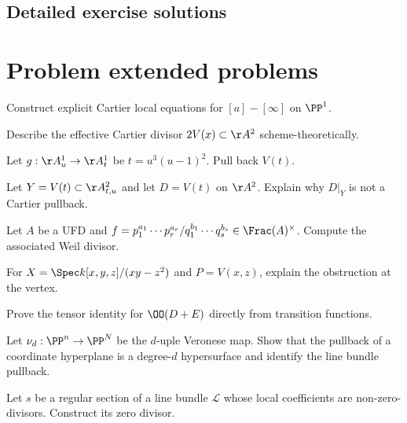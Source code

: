 \subsection*{Detailed exercise solutions}

\fi
\section{Problem extended problems}
\begin{problem}\label{prob:vi40-01}
Construct explicit Cartier local equations for \([a]-[\infty]\) on \(\PP^1\).
\end{problem}
\begin{problem}\label{prob:vi40-02}
Describe the effective Cartier divisor \(2V(x)\subset\AA^2\) scheme-theoretically.
\end{problem}
\begin{problem}\label{prob:vi40-03}
Let \(g:\AA^1_u\to\AA^1_t\) be \(t=u^3(u-1)^2\).  Pull back \(V(t)\).
\end{problem}
\begin{problem}\label{prob:vi40-04}
Let \(Y=V(t)\subset\AA^2_{t,u}\) and let \(D=V(t)\) on \(\AA^2\).  Explain why \(D|_Y\) is not a Cartier pullback.
\end{problem}
\begin{problem}\label{prob:vi40-05}
Let \(A\) be a UFD and \(f=p_1^{a_1}\cdots p_r^{a_r}/q_1^{b_1}\cdots q_s^{b_s}\in\Frac(A)^\times\).  Compute the associated Weil divisor.
\end{problem}
\begin{problem}\label{prob:vi40-06}
For \(X=\Spec k[x,y,z]/(xy-z^2)\) and \(P=V(x,z)\), explain the obstruction at the vertex.
\end{problem}
\begin{problem}\label{prob:vi40-07}
Prove the tensor identity for \(\OO(D+E)\) directly from transition functions.
\end{problem}
\begin{problem}\label{prob:vi40-08}
Let \(\nu_d:\PP^n\to\PP^N\) be the \(d\)-uple Veronese map.  Show that the pullback of a coordinate hyperplane is a degree-\(d\) hypersurface and identify the line bundle pullback.
\end{problem}
\begin{problem}\label{prob:vi40-09}
Let \(s\) be a regular section of a line bundle \(\mathcal L\) whose local coefficients are non-zero-divisors.  Construct its zero divisor.
\end{problem}
